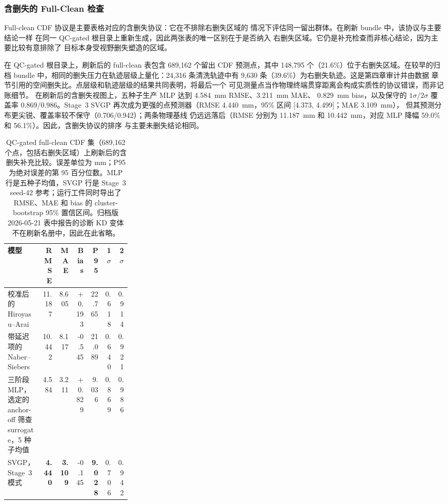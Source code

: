 \subsubsection{含删失的 Full-Clean 检查}
\label{sec:full-clean-supplement}

Full-clean CDF 协议是主要表格对应的含删失协议：它在不排除右删失区域的
情况下评估同一留出群体。在刷新 bundle 中，该协议与主要结论一样
在同一 QC-gated 根目录上重新生成，因此两张表的唯一区别在于是否纳入
右删失区域。它仍是补充检查而非核心结论，因为主要比较有意排除了
目标本身受视野删失塑造的区域。

在 QC-gated 根目录上，刷新后的 full-clean 表包含 689{,}162 个留出
CDF 预测点，其中 148{,}795 个（21.6\%）位于右删失区域。在较早的归档
bundle 中，相同的删失压力在轨迹层级上量化：24{,}316 条清洗轨迹中有
9{,}630 条（39.6\%）为右删失轨迹。这是第四章审计并由数据
章节引用的空间删失比。点层级和轨迹层级的结果共同表明，将最后一个
可见测量点当作物理终端贯穿距离会构成实质性的协议错误，而非记账细节。
在刷新后的含删失视图上，五种子生产 MLP 达到
\SI{4.584}{mm} RMSE、\SI{3.211}{mm} MAE、
\SI{+0.829}{mm} bias，以及保守的 \(1\sigma/2\sigma\) 覆盖率
0.869/0.986。Stage~3 SVGP 再次成为更强的点预测器（RMSE
\SI{4.440}{mm}，95\% 区间 [4.373, 4.499]；MAE \SI{3.109}{mm}），
但其预测分布更尖锐、覆盖率较不保守（0.706/0.942）；两条物理基线
仍远远落后（RMSE 分别为 \SI{11.187}{mm} 和 \SI{10.442}{mm}，对应
MLP 降幅 59.0\% 和 56.1\%）。因此，含删失协议的排序
与主要未删失结论相同。

\begin{table}[t]
\centering
\footnotesize
\setlength{\tabcolsep}{3pt}
\begin{tabular}{@{}L{0.28\linewidth}rrrrrr@{}}
\toprule
模型 & RMSE & MAE & Bias & P95 & 1$\sigma$ & 2$\sigma$ \\
\midrule
校准后的 Hiroyasu--Arai & 11.187 & 8.605 & +0.193 & 22.765 & 0.618 & 0.914 \\
带延迟项的 Naber--Siebers & 10.442 & 8.117 & -0.545 & 21.089 & 0.640 & 0.921 \\
三阶段 MLP，选定的 anchor-off 筛查 surrogate，5 种子均值 & 4.584 & 3.211 & +0.829 & 9.036 & 0.869 & 0.986 \\
SVGP，Stage~3 模式 & \textbf{4.440} & \textbf{3.109} & -0.145 & \textbf{9.028} & 0.706 & 0.942 \\
\bottomrule
\end{tabular}
\caption{QC-gated full-clean CDF 集（689{,}162 个点，包括右删失区域）上刷新后的含删失补充比较。误差单位为 mm；P95 为绝对误差的第 95 百分位数。MLP 行是五种子均值，SVGP 行是 Stage~3 seed-42 参考；运行工件同时导出了 RMSE、MAE 和 bias 的 cluster-bootstrap 95\% 置信区间。归档版 2026-05-21 表中报告的诊断 KD 变体不在刷新名册中，因此在此省略。}
\label{tab:external-clean-headline}
\end{table}

